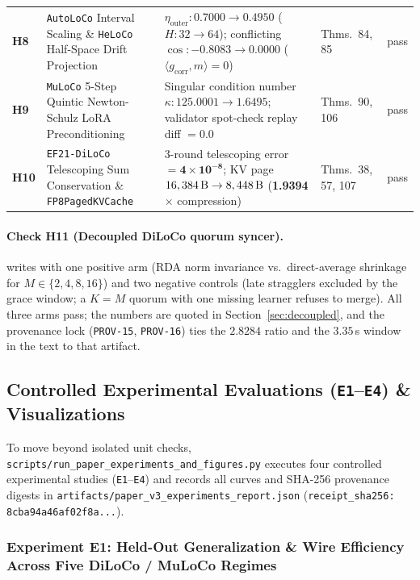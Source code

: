 \documentclass[11pt,a4paper]{article}
\begin{document}
\begin{table}[ht!]
{\begin{tabular}{@{}llp{6.6cm}lc@{}}
\textbf{H8} & \texttt{AutoLoCo} Interval Scaling \& \texttt{HeLoCo} Half-Space Drift Projection & $\eta_{\text{outer}}: 0.7000 \to 0.4950$ ($H: 32 \to 64$); conflicting $\cos: -0.8083 \to 0.0000$ ($\langle g_{\text{corr}}, m \rangle = 0$) & Thms.\ 84, 85 & pass \\
\textbf{H9} & \texttt{MuLoCo} 5-Step Quintic Newton-Schulz LoRA Preconditioning & Singular condition number $\kappa: 125.0001 \to \mathbf{1.6495}$; validator spot-check replay diff $= \mathbf{0.0}$ & Thms.\ 90, 106 & pass \\
\textbf{H10} & \texttt{EF21-DiLoCo} Telescoping Sum Conservation \& \texttt{FP8PagedKVCache} & 3-round telescoping error $= \mathbf{4 \times 10^{-8}}$; KV page $16,384\text{\,B} \to 8,448\text{\,B}$ (\textbf{1.9394$\times$} compression) & Thms.\ 38, 57, 107 & pass \\
\bottomrule
\end{tabular}%
}
\end{table}

\paragraph{Check H11 (Decoupled DiLoCo quorum syncer).}  writes  with one positive arm (RDA norm invariance vs.\ direct-average shrinkage for $M \in \{2,4,8,16\}$) and two negative controls (late stragglers excluded by the grace window; a $K=M$ quorum with one missing learner refuses to merge). All three arms pass; the numbers are quoted in Section~\ref{sec:decoupled}, and the provenance lock (\texttt{PROV-15}, \texttt{PROV-16}) ties the $2.8284$ ratio and the $3.35$\,s window in the text to that artifact.

\subsection{Controlled Experimental Evaluations (\texttt{E1}--\texttt{E4}) \& Visualizations}

To move beyond isolated unit checks, \texttt{scripts/run\_paper\_experiments\_and\_figures.py} executes four controlled experimental studies (\texttt{E1}--\texttt{E4}) and records all curves and SHA-256 provenance digests in \texttt{artifacts/paper\_v3\_experiments\_report.json} (\texttt{receipt\_sha256: 8cba94a46af02f8a...}).

\subsubsection{Experiment E1: Held-Out Generalization \& Wire Efficiency Across Five DiLoCo / MuLoCo Regimes}
\end{document}
